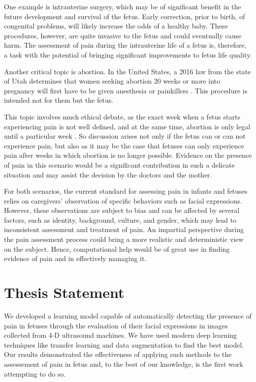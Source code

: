 One example is intrauterine surgery, which may be of significant benefit in the future development and survival of the fetus. Early correction, prior to birth, of congenital problems, will likely increase the odds of a healthy baby. These procedures, however, are quite invasive to the fetus and could eventually cause harm. The assessment of pain during the intrauterine life of a fetus is, therefore, a task with the potential of bringing significant improvements to fetus life quality. 

Another critical topic is abortion. In the United States, a 2016 law from the state of Utah determines that women seeking abortion 20 weeks or more into pregnancy will first have to be given anesthesia or painkillers \citep{healy2016nytimes}. This procedure is intended not for them but the fetus. 

This topic involves much ethical debate, as the exact week when a fetus starts experiencing pain is not well defined, and at the same time, abortion is only legal until a particular week \citep{Derbyshire2006}. So discussion arises not only if the fetus can or can not experience pain, but also as it may be the case that fetuses can only experience pain after weeks in which abortion is no longer possible. Evidence on the presence of pain in this scenario would be a significant contribution in such a delicate situation and may assist the decision by the doctors and the mother.

For both scenarios, the current standard for assessing pain in infants and fetuses relies on caregivers' observation of specific behaviors such as facial expressions. However, these observations are subject to bias and can be affected by several factors, such as identity, background, culture, and gender, which may lead to inconsistent assessment and treatment of pain. An impartial perspective during the pain assessment process could bring a more realistic and deterministic view on the subject. Hence, computational help would be of great use in finding evidence of pain and in effectively managing it.

\section{Thesis Statement}

We developed a learning model capable of automatically detecting the presence of pain in fetuses through the evaluation of their facial expressions in images collected from 4-D ultrasound machines. We have used modern deep learning techniques like transfer learning and data augmentation to find the best model. Our results demonstrated the effectiveness of applying such methods to the assessement of pain in fetus and, to the best of our knowledge, is the first work attempting to do so.

